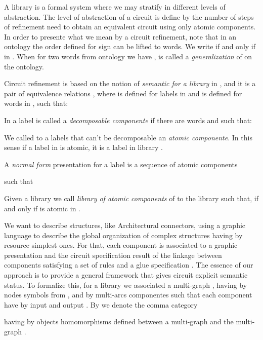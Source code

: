 \documentclass[oribibl]{llncs}
\begin{document}
A library is a formal system where we may stratify in different levels of abstraction. The level of abstraction of a circuit is define by the number of steps of refinement need to obtain an equivalent circuit using only atomic components. In order to presente what we mean by a circuit refinement, note that in an ontology  the order defined for sign can be lifted to words. We write  if and only if  in . When for two words from ontology we have ,  is called a \emph{generalization} of  on the ontology.

Circuit refinement is based on the notion of \emph{semantic for a library} in , and it is a pair of equivalence relations
 , where  is defined for labels in  and  is
 defined for words in , such that:

In  a label  is called a \emph{decomposable componente} if there are words  and  such that:

  We called to a labels that can't be decomposable  an \emph{atomic componente}. In this sense if a label in  is atomic, it is a label in library .

A \emph{normal form} presentation for a label  is a sequence of atomic components

such that


Given a library  we call \emph{library of atomic components} of  to the library  such that,   if and only if  is atomic in .

We want to describe structures, like Architectural connectors, using a graphic language to describe the global organization of complex structures having by resource simplest ones. For that, each component is associated to a graphic presentation and the circuit specification result of the linkage between components satisfying a set of rules and a glue specification \cite{Allen97}. The essence of our approach is to provide a general framework that gives circuit explicit semantic status. To formalize this, for a library  we associated a  multi-graph , having by nodes symbols from , and by multi-arcs componentes such that each component  have by input  and output .
By  we denote the comma category

having by objects homomorphisms defined between a multi-graph and the multi-graph .
\end{document}
